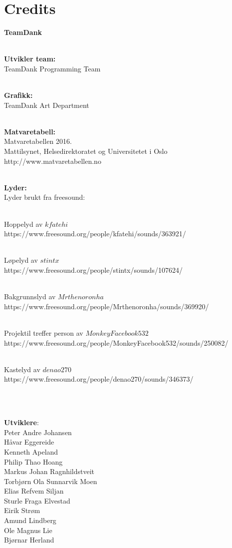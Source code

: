 \documentclass[paper=a4]{article}
\begin{document}
\newpage
\section{Credits}

\begin{center} 
\textbf{TeamDank}\\ \

\textbf{Utvikler team:}\\
TeamDank Programming Team\\ \

\textbf{Grafikk:} \\
TeamDank Art Department \\ \

\textbf{Matvaretabell:} \\ 
Matvaretabellen 2016. \\
Mattilsynet, Helsedirektoratet og Universitetet i Oslo \\ http://www.matvaretabellen.no \\ \

\textbf{Lyder:} \\ 
Lyder brukt fra freesound: \\ \

Hoppelyd av $kfatehi$ \\ https://www.freesound.org/people/kfatehi/sounds/363921/ \\ \

Løpelyd av $stintx$ \\ https://www.freesound.org/people/stintx/sounds/107624/ \\ \

Bakgrunnslyd av $Mrthenoronha$ \\ https://www.freesound.org/people/Mrthenoronha/sounds/369920/ \\ \

Projektil treffer person av $MonkeyFacebook532$ \\ https://www.freesound.org/people/MonkeyFacebook532/sounds/250082/ \\ \

Kastelyd av $denao270$ \\ https://www.freesound.org/people/denao270/sounds/346373/ \\ \

\

\textbf{Utviklere}: \\
Peter Andre Johansen \\
Håvar Eggereide \\
Kenneth Apeland \\
Philip Thao Hoang \\
Markus Johan Ragnhildstveit \\
Torbjørn Ola Sunnarvik Moen \\
Elias Refvem Siljan \\
Sturle Fraga Elvestad \\
Eirik Strøm \\
Amund Lindberg \\
Ole Magnus Lie \\
Bjørnar Herland \\ \


\end{center}
\end{document}
